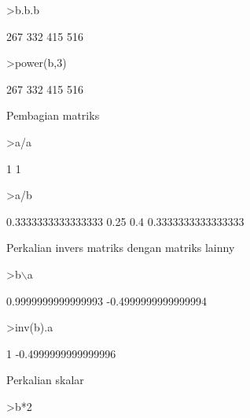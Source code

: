 \documentclass[a4paper,10pt]{article}
\begin{document}
\begin{eulernotebook}
\begin{eulercomment}
\begin{eulercomment}
\begin{eulercomment}
\begin{eulercomment}
\begin{euleroutput}
\end{euleroutput}
\begin{eulerprompt}
>b.b.b
\end{eulerprompt}
\begin{euleroutput}
                      267                     332 
                      415                     516 
\end{euleroutput}
\begin{eulerprompt}
>power(b,3)
\end{eulerprompt}
\begin{euleroutput}
                      267                     332 
                      415                     516 
\end{euleroutput}
\begin{eulercomment}
Pembagian matriks
\end{eulercomment}
\begin{eulerprompt}
>a/a
\end{eulerprompt}
\begin{euleroutput}
                        1 
                        1 
\end{euleroutput}
\begin{eulerprompt}
>a/b
\end{eulerprompt}
\begin{euleroutput}
       0.3333333333333333                    0.25 
                      0.4      0.3333333333333333 
\end{euleroutput}
\begin{eulercomment}
Perkalian invers matriks dengan matriks lainny
\end{eulercomment}
\begin{eulerprompt}
>b\(\backslash\)a
\end{eulerprompt}
\begin{euleroutput}
       0.9999999999999993 
      -0.4999999999999994 
\end{euleroutput}
\begin{eulerprompt}
>inv(b).a
\end{eulerprompt}
\begin{euleroutput}
                        1 
      -0.4999999999999996 
\end{euleroutput}
\begin{eulercomment}
Perkalian skalar
\end{eulercomment}
\begin{eulerprompt}
>b*2
\end{eulerprompt}
\begin{euleroutput}

\end{euleroutput}
\end{eulercomment}
\end{eulercomment}
\end{eulercomment}
\end{eulercomment}
\end{eulernotebook}
\end{document}
